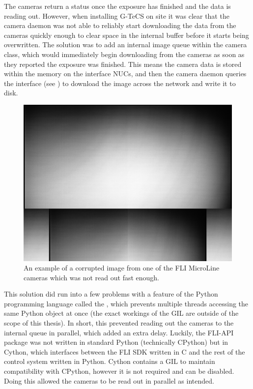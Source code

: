\begin{colsection}
The cameras return a  status once the exposure has finished and the data is reading out. However, when installing G-TeCS on site it was clear that the camera daemon was not able to reliably start downloading the data from the cameras quickly enough to clear space in the internal buffer before it starts being overwritten. The solution was to add an internal image queue within the camera class, which would immediately begin downloading from the cameras as soon as they reported the exposure was finished. This means the camera data is stored within the memory on the interface NUCs, and then the camera daemon queries the interface (see ) to download the image across the network and write it to disk.

\begin{figure}[t]
    \begin{center}
        \includegraphics[width=0.7\linewidth]{images/cam_readout.png}
    \end{center}
    \caption[A corrupted image which was not read out fast enough]{
        An example of a corrupted image from one of the FLI MicroLine cameras which was not read out fast enough.
    }\label{fig:cam_readout}
\end{figure}

This solution did run into a few problems with a feature of the Python programming language called the , which prevents multiple threads accessing the same Python object at once (the exact workings of the GIL are outside of the scope of this thesis). In short, this prevented reading out the cameras to the internal queue in parallel, which added an extra delay. Luckily, the FLI-API package was not written in standard Python (technically CPython) but in Cython, which interfaces between the FLI SDK written in C and the rest of the control system written in Python. Cython contains a GIL to maintain compatibility with CPython, however it is not required and can be disabled. Doing this allowed the cameras to be read out in parallel as intended.


\end{colsection}
